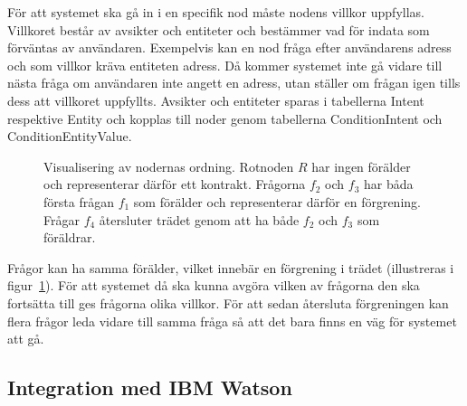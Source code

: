 \documentclass[a4paper,12pt]{article}
\begin{document}
För att systemet ska gå in i en specifik nod måste nodens villkor uppfyllas. Villkoret består av avsikter och entiteter och bestämmer vad för indata som förväntas av användaren. Exempelvis kan en nod fråga efter användarens adress och som villkor kräva entiteten adress. Då kommer systemet inte gå vidare till nästa fråga om användaren inte angett en adress, utan ställer om frågan igen tills dess att villkoret uppfyllts. Avsikter och entiteter sparas i tabellerna \mbox{Intent} respektive \mbox{Entity} och kopplas till noder genom tabellerna \mbox{ConditionIntent} och \mbox{ConditionEntityValue}.

\begin{figure}[H]
    \centering
    \smallskip
    \smallskip
    \caption{Visualisering av nodernas ordning. Rotnoden $R$ har ingen förälder och representerar därför ett kontrakt. Frågorna $f_2$ och $f_3$ har båda första frågan $f_1$ som förälder och representerar därför en förgrening. Frågar $f_4$ återsluter trädet genom att ha både $f_2$ och $f_3$ som föräldrar.}
    \label{fig:dialog-tree-example}
\end{figure}
Frågor kan ha samma förälder, vilket innebär en förgrening i trädet (illustreras i figur~\ref{fig:dialog-tree-example}). För att systemet då ska kunna avgöra vilken av frågorna den ska fortsätta till ges frågorna olika villkor. För att sedan återsluta förgreningen kan flera frågor leda vidare till samma fråga så att det bara finns en väg för systemet att gå.
\FloatBarrier

\subsection{Integration med IBM Watson}
\label{subsec:integrate-watson}
\FloatBarrier
\end{document}
